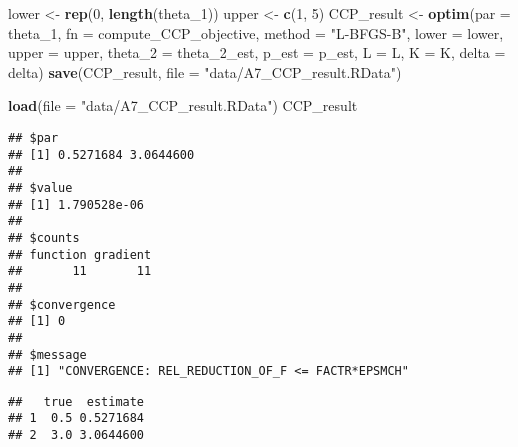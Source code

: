 \documentclass[
]{book}
\newenvironment{Shaded}{\begin{snugshade}}{\end{snugshade}}
\newcommand{\DataTypeTok}[1]{\textcolor[rgb]{0.13,0.29,0.53}{#1}}
\newcommand{\DecValTok}[1]{\textcolor[rgb]{0.00,0.00,0.81}{#1}}
\newcommand{\KeywordTok}[1]{\textcolor[rgb]{0.13,0.29,0.53}{\textbf{#1}}}
\newcommand{\NormalTok}[1]{#1}
\newcommand{\OperatorTok}[1]{\textcolor[rgb]{0.81,0.36,0.00}{\textbf{#1}}}
\newcommand{\StringTok}[1]{\textcolor[rgb]{0.31,0.60,0.02}{#1}}
\begin{document}
\begin{Shaded}
\begin{Highlighting}[]
\NormalTok{lower <-}\StringTok{ }\KeywordTok{rep}\NormalTok{(}\DecValTok{0}\NormalTok{, }\KeywordTok{length}\NormalTok{(theta_}\DecValTok{1}\NormalTok{))}
\NormalTok{upper <-}\StringTok{ }\KeywordTok{c}\NormalTok{(}\DecValTok{1}\NormalTok{, }\DecValTok{5}\NormalTok{)}
\NormalTok{CCP_result <-}
\StringTok{  }\KeywordTok{optim}\NormalTok{(}\DataTypeTok{par =}\NormalTok{ theta_}\DecValTok{1}\NormalTok{,}
        \DataTypeTok{fn =}\NormalTok{ compute_CCP_objective,}
        \DataTypeTok{method =} \StringTok{"L-BFGS-B"}\NormalTok{,}
        \DataTypeTok{lower =}\NormalTok{ lower,}
        \DataTypeTok{upper =}\NormalTok{ upper,}
        \DataTypeTok{theta_2 =}\NormalTok{ theta_}\DecValTok{2}\NormalTok{_est, }
        \DataTypeTok{p_est =}\NormalTok{ p_est, }
        \DataTypeTok{L =}\NormalTok{ L, }
        \DataTypeTok{K =}\NormalTok{ K, }
        \DataTypeTok{delta =}\NormalTok{ delta)}
\KeywordTok{save}\NormalTok{(CCP_result, }\DataTypeTok{file =} \StringTok{"data/A7_CCP_result.RData"}\NormalTok{)}
\end{Highlighting}
\end{Shaded}

\begin{Shaded}
\begin{Highlighting}[]
\KeywordTok{load}\NormalTok{(}\DataTypeTok{file =} \StringTok{"data/A7_CCP_result.RData"}\NormalTok{)}
\NormalTok{CCP_result}
\end{Highlighting}
\end{Shaded}

\begin{verbatim}
## $par
## [1] 0.5271684 3.0644600
## 
## $value
## [1] 1.790528e-06
## 
## $counts
## function gradient 
##       11       11 
## 
## $convergence
## [1] 0
## 
## $message
## [1] "CONVERGENCE: REL_REDUCTION_OF_F <= FACTR*EPSMCH"
\end{verbatim}

\begin{Shaded}
\end{Shaded}

\begin{verbatim}
##   true  estimate
## 1  0.5 0.5271684
## 2  3.0 3.0644600
\end{verbatim}
\end{document}
